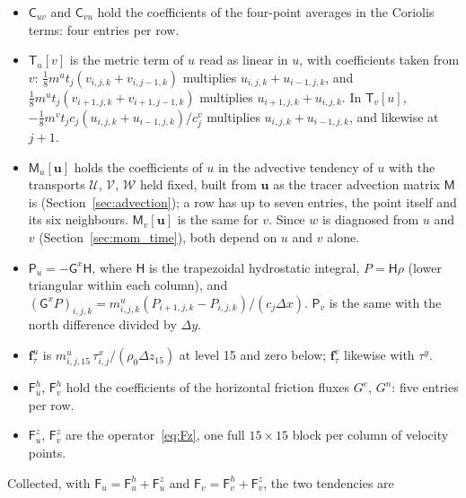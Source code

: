 \documentclass{article}
\begin{document}
\begin{itemize}
\item $\mathsf{C}_{uv}$ and $\mathsf{C}_{vu}$ hold the coefficients of the four-point averages in the Coriolis terms: four entries per row.
\item $\mathsf{T}_u[v]$ is the metric term of $u$ read as linear in $u$, with coefficients taken from $v$: $\tfrac18 m^u t_j (v_{i,j,k} + v_{i,j-1,k})$ multiplies $u_{i,j,k} + u_{i-1,j,k}$, and $\tfrac18 m^u t_j (v_{i+1,j,k} + v_{i+1,j-1,k})$ multiplies $u_{i+1,j,k} + u_{i,j,k}$. In $\mathsf{T}_v[u]$, $-\tfrac18 m^v t_j c_j (u_{i,j,k} + u_{i-1,j,k})/c^v_j$ multiplies $u_{i,j,k} + u_{i-1,j,k}$, and likewise at $j+1$.
\item $\mathsf{M}_u[\mathbf{u}]$ holds the coefficients of $u$ in the advective tendency of $u$ with the transports $\mathcal{U}$, $\mathcal{V}$, $\mathcal{W}$ held fixed, built from $\mathbf{u}$ as the tracer advection matrix $\mathsf{M}$ is (Section~\ref{sec:advection}); a row has up to seven entries, the point itself and its six neighbours. $\mathsf{M}_v[\mathbf{u}]$ is the same for $v$. Since $w$ is diagnosed from $u$ and $v$ (Section~\ref{sec:mom_time}), both depend on $u$ and $v$ alone.
\item $\mathsf{P}_u = -\mathsf{G}^x\mathsf{H}$, where $\mathsf{H}$ is the trapezoidal hydrostatic integral, $P = \mathsf{H}\rho$ (lower triangular within each column), and $(\mathsf{G}^x P)_{i,j,k} = m^u_{i,j,k}(P_{i+1,j,k} - P_{i,j,k})/(c_j\Delta x)$. $\mathsf{P}_v$ is the same with the north difference divided by $\Delta y$.
\item $\mathbf{f}^u_\tau$ is $m^u_{i,j,15}\,\tau^x_{i,j}/(\rho_0\Delta z_{15})$ at level 15 and zero below; $\mathbf{f}^v_\tau$ likewise with $\tau^y$.
\item $\mathsf{F}^h_u$, $\mathsf{F}^h_v$ hold the coefficients of the horizontal friction fluxes $G^e$, $G^n$: five entries per row.
\item $\mathsf{F}^z_u$, $\mathsf{F}^z_v$ are the operator~\eqref{eq:Fz}, one full $15\times15$ block per column of velocity points.
\end{itemize}
Collected, with $\mathsf{F}_u = \mathsf{F}^h_u + \mathsf{F}^z_u$ and $\mathsf{F}_v = \mathsf{F}^h_v + \mathsf{F}^z_v$, the two tendencies are
\end{document}

